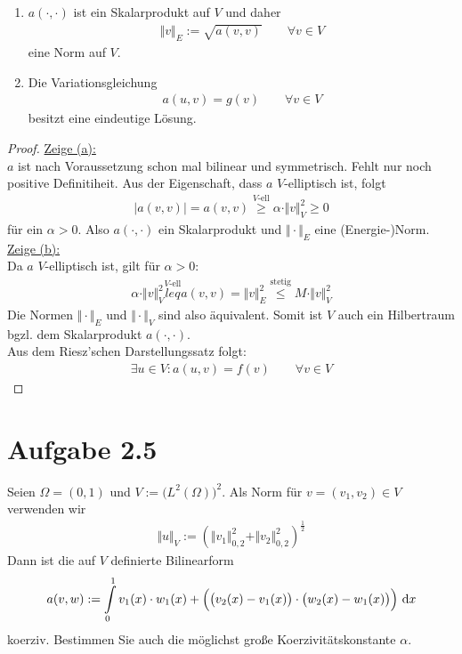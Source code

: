 \documentclass[12pt,a4paper]{article}
\begin{document}
\begin{enumerate}[label=(\alph*)]
\item $a(\cdot,\cdot)$ ist ein Skalarprodukt auf $V$ und daher
\begin{align*}
\Vert v\Vert_E:=\sqrt{a(v,v)}\qquad\forall v\in V
\end{align*}
eine Norm auf $V$.
\item Die Variationsgleichung
\begin{align*}
a(u,v)=g(v)\qquad\forall v\in V
\end{align*}
besitzt eine eindeutige Lösung.
\end{enumerate}
\begin{proof}
\underline{Zeige (a):}\\
$a$ ist nach Voraussetzung schon mal bilinear und symmetrisch. Fehlt nur noch positive Definitiheit. Aus der Eigenschaft, dass $a$ $V$-elliptisch ist, folgt
\begin{align*}
|a(v,v)|=a(v,v)\stackrel{V\text{-ell}}{\geq}
\alpha\cdot\Vert v\Vert^2_V\geq0
\end{align*}
für ein $\alpha>0$. Also $a(\cdot,\cdot)$ ein Skalarprodukt und $\Vert\cdot\Vert_E$ eine (Energie-)Norm.\\

\underline{Zeige (b):}\\
Da $a$ $V$-elliptisch ist, gilt für $\alpha>0$:
\begin{align*}
\alpha\cdot\Vert v\Vert_V^2
\stackrel{V\text{-ell}}{leq}
a(v,v)=\Vert v\Vert_E^2
\stackrel{\text{stetig}}{\leq}
M\cdot\Vert v\Vert_V^2
\end{align*}
Die Normen $\Vert\cdot\Vert_E$ und $\Vert\cdot\Vert_V$ sind also äquivalent. Somit ist $V$ auch ein Hilbertraum bgzl. dem Skalarprodukt $a(\cdot,\cdot)$.\\

Aus dem Riesz'schen Darstellungssatz folgt:
\begin{align*}
\exists u\in V:a(u,v)=f(v)\qquad\forall v\in V
\end{align*}
\end{proof}

\section*{Aufgabe 2.5}
Seien $\Omega=(0,1)$ und $V:=\big(L^2(\Omega)\big)^2$. Als Norm für $v=(v_1,v_2)\in V$ verwenden wir
\begin{align*}
\Vert u\Vert_V:=\left(\Vert v_1\Vert_{0,2}^2+\Vert v_2\Vert^2_{0,2}\right)^{\frac{1}{2}}
\end{align*}
Dann ist die auf $V$ definierte Bilinearform
\begin{align*}
a(v,w):=\int\limits_0^1 v_1(x)\cdot w_1(x)+\Big(\big(v_2(x)-v_1(x)\big)\cdot\big(w_2(x)-w_1(x)\big)\Big)\text{ d} x
\end{align*}
koerziv. Bestimmen Sie auch die möglichst große Koerzivitätskonstante $\alpha$.
\end{document}
